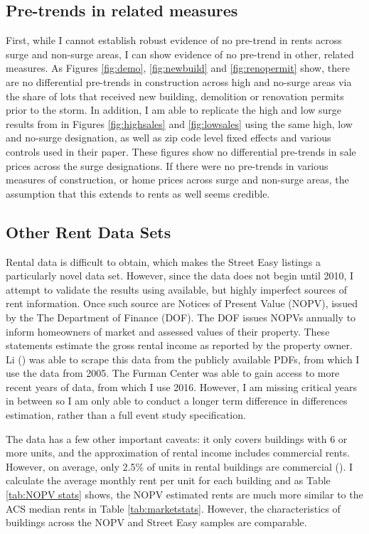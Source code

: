 \documentclass[12pt]{article}
\begin{document}
{{{{{\subsection{Pre-trends in related measures}
First, while I cannot establish robust evidence of no pre-trend in rents across surge and non-surge areas, I can show evidence of no pre-trend in other, related measures. As Figures \ref{fig:demo}, \ref{fig:newbuild} and \ref{fig:renopermit} show, there are no differential pre-trends in construction across high and no-surge areas via the share of lots that received new building, demolition or renovation permits prior to the storm.  In addition, I am able to replicate the high and low surge results from \cite{ellen_heterogeneity_2022}in Figures \ref{fig:highsales} and \ref{fig:lowsales} using the same high, low and no-surge designation, as well as zip code level fixed effects and various controls used in their paper. These figures show no differential pre-trends in sale prices across the surge designations. If there were no pre-trends in various measures of construction, or home prices across surge and non-surge areas, the assumption that this extends to rents as well seems credible. 

\subsection{Other Rent Data Sets}
Rental data is difficult to obtain, which makes the Street Easy listings a particularly novel data set. However, since the data does not begin until 2010, I attempt to validate the results using available, but highly imperfect sources of rent information. Once such source are Notices of Present Value (NOPV), issued by the The Department of Finance (DOF).  The DOF issues NOPVs annually to inform homeowners of market and assessed values of their property.  These statements estimate the gross rental income as reported by the property owner. Li 
(\citeyear{li_new_2022}) was able to scrape this data from the publicly available PDFs, from which I use the data from 2005. The Furman Center was able to gain access to more recent years of data, from which I use 2016.  However, I am missing critical years in between so I am only able to conduct  a longer term difference in differences estimation, rather than a full event study specification.  

The data has a few other important caveats: it only covers buildings with 6 or more units, and the approximation of rental income includes commercial rents. However, on average, only 2.5\% of units in rental buildings are commercial (\cite{li_new_2022}).  I calculate the average monthly rent per unit for each building and as Table \ref{tab:NOPV stats} shows, the NOPV estimated rents are much more similar to the ACS median rents in Table \ref{tab:marketstats}.  However, the characteristics of buildings across the NOPV and Street Easy samples are comparable.  

}}}}}
\end{document}
